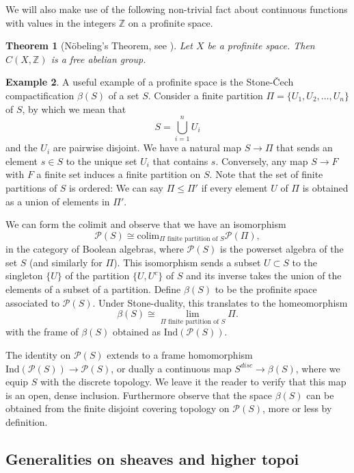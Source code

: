 \documentclass[10pt]{amsart}
\newtheorem{theorem}{Theorem}[section]
\theoremstyle{definition}
\newtheorem{example}[theorem]{Example}
\begin{document}
We will also make use of the following non-trivial fact about continuous functions with values in the integers $\mathbb{Z}$ on a profinite space.

\begin{theorem}[Nöbeling's Theorem, see \cite{asgeirsson:LIPIcs.ITP.2024.6}] \label{noebelingstheorem}
Let $X$ be a profinite space. Then $C(X, \mathbb{Z})$ is a free abelian group.
\end{theorem}

\begin{example}
A useful example of a profinite space is the Stone-\v{C}ech compactification $\beta(S)$ of a set $S$. Consider a finite partition $\Pi = \{U_1, U_2, \hdots, U_n\}$ of $S$, by which we mean that
$$S = \bigcup_{i = 1}^n U_i$$
and the $U_i$ are pairwise disjoint. We have a natural map $S \rightarrow \Pi$ that sends an element $s \in S$ to the unique set $U_i$ that contains $s$. Conversely, any map $S \rightarrow F$ with $F$ a finite set induces a finite partition on $S$. Note that the set of finite partitions of $S$ is ordered: We can say $\Pi \leq \Pi'$ if every element $U$ of $\Pi$ is obtained as a union of elements in $\Pi'$.

We can form the colimit and observe that we have an isomorphism
$$\mathcal{P}(S) \cong \mathrm{colim}_{ \Pi \text{ finite partition of } S} \mathcal{P}(\Pi),$$
in the category of Boolean algebras, where $\mathcal{P}(S)$ is the powerset algebra of the set $S$ (and similarly for $\Pi$). This isomorphism sends a subset $U \subset S$ to the singleton $\{U\}$ of the partition $\{U,U^c\}$ of $S$ and its inverse takes the union of the elements of a subset of a partition. Define $\beta(S)$ to be the profinite space associated to $\mathcal{P}(S)$. Under Stone-duality, this translates to the homeomorphism
$$\beta(S) \cong \lim_{ \Pi \text{ finite partition of } S} \Pi.$$
with the frame of $\beta(S)$ obtained as $\mathrm{Ind}(\mathcal{P}(S))$.

The identity on $\mathcal{P}(S)$ extends to a frame homomorphism $\mathrm{Ind}(\mathcal{P}(S)) \rightarrow \mathcal{P}(S)$, or dually a continuous map $S^{disc} \rightarrow \beta(S)$, where we equip $S$ with the discrete topology. We leave it the reader to verify that this map is an open, dense inclusion. Furthermore observe that the space $\beta(S)$ can be obtained from the finite disjoint covering topology on $\mathcal{P}(S)$, more or less by definition.
\end{example}


\subsection{Generalities on sheaves and higher topoi} \label{generalitiestopoi}
\end{document}
